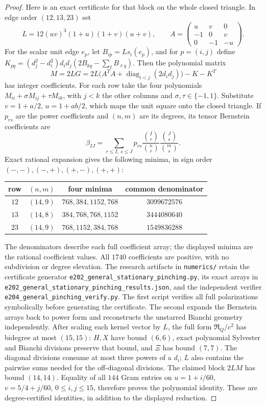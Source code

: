 \documentclass[11pt]{article}
\numberwithin{equation}{section}
\theoremstyle{definition}
\theoremstyle{remark}
\begin{document}
\begin{proof}
Here is an exact certificate for that block on the whole
closed triangle. In edge order $(12,13,23)$ set
\[
 L=12(uv)^3(1+u)(1+v)(u+v),\qquad
 A=\begin{pmatrix}u&v&0\\-1&0&v\\0&-1&-u\end{pmatrix}.
\]
For the scalar unit edge $e_p$, let $B_{ip}=Ls_i(e_p)$,
and for $p=(i,j)$ define
$K_{pq}=(d_j^2-d_i^2)d_id_j(2B_{kq}-\sum_\ell B_{\ell q})$.
Then the polynomial matrix
\begin{equation}\label{eq:stationary-cleared-block}
 M=2LG=2L\bigl(A^TA+\operatorname{diag}_{i<j}(2d_id_j)\bigr)
                                      -K-K^T
\end{equation}
has integer coefficients. For each row take the four
polynomials $M_{ii}+\sigma M_{ij}+\tau M_{ik}$, with $j<k$
the other columns and $\sigma,\tau\in\{-1,1\}$.
Substitute $v=1+a/2$, $u=1+ab/2$, which maps the unit
square onto the closed triangle. If $p_{rs}$ are the power
coefficients and $(n,m)$ are its degrees, its tensor
Bernstein coefficients are
\[
 \beta_{IJ}=\sum_{r\le I,\ s\le J}
      p_{rs}\frac{\binom Ir}{\binom nr}
             \frac{\binom Js}{\binom ms}.
\]
Exact rational expansion gives the following minima,
in sign order $(-,-),(-,+),(+,-),(+,+)$:
\begin{center}
\begin{tabular}{c c c c}
row & $(n,m)$ & four minima & common denominator\\\hline
$12$ & $(14,9)$ & $768,384,1152,768$ & $3099672576$\\
$13$ & $(14,8)$ & $384,768,768,1152$ & $3444080640$\\
$23$ & $(14,9)$ & $768,1152,384,768$ & $1549836288$
\end{tabular}
\end{center}
The denominators describe each full coefficient array;
the displayed minima are the rational coefficient values.
All $1740$ coefficients are positive, with no subdivision
or degree elevation. The research artifacts in \texttt{numerics/}
retain the certificate generator
\texttt{e202\_general\_stationary\_pinching.py}, its exact arrays
in \texttt{e202\_general\_stationary\_pinching\_results.json},
and the independent verifier
\texttt{e204\_general\_pinching\_verify.py}. The first script verifies all full
polarizations symbolically before generating the certificate.
The second expands the Bernstein arrays back to power form
and reconstructs the unstarred Bianchi geometry independently.
After scaling each kernel vector by $L$, the full form
$\mathfrak R_Q/c^2$ has bidegree at most $(15,15)$:
$H,X$ have bound $(6,6)$, exact polynomial Sylvester and
Bianchi divisions preserve that bound, and $\Xi$ has bound
$(7,7)$. The diagonal divisions consume at most three
powers of a $d_i$; $L$ also contains the pairwise sums
needed for the off-diagonal divisions. The claimed block $2LM$ has bound $(14,14)$.
Equality of all $144$ Gram entries on
$u=1+i/60$, $v=5/4+j/60$, $0\le i,j\le15$, therefore
proves the polynomial identity. These are degree-certified
identities, in addition to the displayed reduction.


\end{proof}
\end{document}
